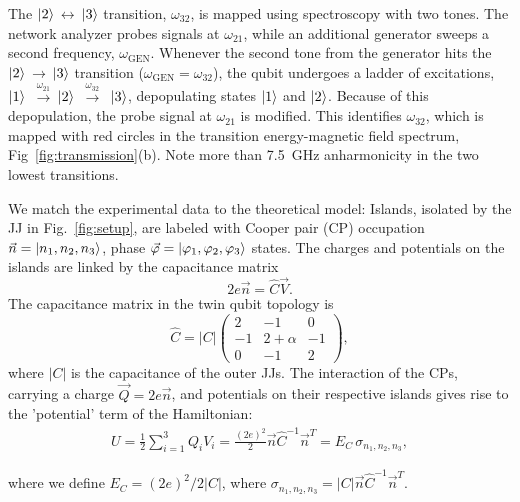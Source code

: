 \documentclass[%
reprint,
superscriptaddress,
bibnotes,
amsmath,
amssymb,
aps,
showkeys,
prb,
]{revtex4-2}
\newcommand{\iket}[1]{\ensuremath{\Ket{#1}}}
\newcommand{\ira}{\ensuremath{\,\rightarrow\,}}
\newcommand{\ilra}{\ensuremath{\,\leftrightarrow\,}}
\newcommand{\iabs}[1]{\ensuremath{\left|#1\right|}}
\newcommand{\iratext}[1]{\ensuremath{\,\xrightarrow{\text{#1}}\,}}
\begin{document}
The  \iket{2}\ilra\iket{3}  transition,  $\omega_{32}$,   is  mapped  using
spectroscopy with two tones. The network  analyzer probes  signals at  $ \omega_{21}  $, while  an
additional generator  sweeps a second  frequency, $ \omega_{\text{GEN}}  $.  Whenever
the second tone from the generator hits the \iket{2}\ira\iket{3} transition
($\omega_{\text{GEN}}  = \omega_{32}  $), the  qubit  undergoes a  ladder of  excitations,
\iket{1}  \iratext{$\omega_{21}$}\iket{2}  \iratext{$\omega_{32}$} \iket{3},  depopulating
states \iket{1} and \iket{2}.  Because of this depopulation, the probe signal at $\omega_{21}$ is
modified.
This identifies  $\omega_{32}$, which  is mapped  with red  circles in  the transition
energy-magnetic field spectrum, Fig~\ref{fig:transmission}(b). Note more than 7.5~GHz anharmonicity in the two lowest transitions.  

We match the  experimental data to the theoretical model: Islands,  isolated by the
JJ  in  Fig.~\ref{fig:setup},  are  labeled with  Cooper  pair  (CP)  occupation
$       \vec{n}      =       \iket{n_1,      n_2,       n_3}      $,       phase
$     \vec{\varphi}     =     \iket{\varphi_1,     \varphi_2,     \varphi_3}     $  states.  The charges and potentials on
the islands are linked by the capacitance matrix
\begin{equation}
  \label{eq:link}
  2e\vec{n} = \hat{C}\vec{V}.
\end{equation}
The capacitance matrix in the twin qubit topology is
\begin{equation}
  \hat{C} = \iabs{C} \begin{pmatrix}
    2  &  -1  &  0\\
    -1  &  2  +  \alpha  &  -1\\
    0  &  -1  & 2
  \end{pmatrix},
  \label{eq:capac}
\end{equation}
where \iabs{C}  is the capacitance of the outer  JJs.  The interaction
of the  CPs, carrying a  charge $ \vec{Q}=2e\vec{n}  $, and potentials  on their
respective islands gives rise to the 'potential' term of the Hamiltonian:
\begin{equation}\label{eq:potential}
  \begin{aligned}
    U = \frac{1}{2}\sum_{i=1}^{3}Q_iV_i =
    \frac{(2e)^2}{2}\vec{n}\hat{C}^{-1}\vec{n}^{T} = E_C\,\sigma_{n_1, n_2, n_3},
  \end{aligned}
\end{equation}

\noindent where we define $ E_{C}={(2e)^{2}}/{2 \iabs{C} } $, where $\sigma_{n_1, n_2, n_3} = \iabs{C}\vec{n}\hat{C}^{-1}\vec{n}^{T}$.
\end{document}
